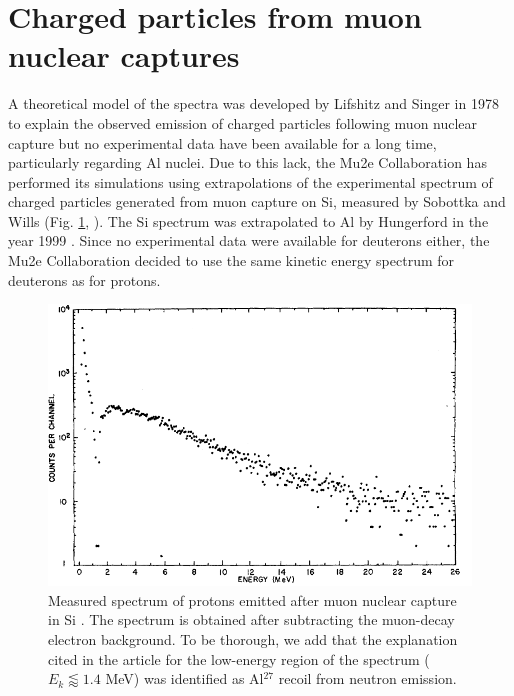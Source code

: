 \documentclass[12pt,a4paper,openright, oneside, titlepage]{book} %
\begin{document}
\section{Charged particles from muon nuclear captures}
A theoretical model of the spectra was developed by Lifshitz and Singer in 1978 \cite{Lifshitz} 
to explain the observed emission of charged particles following muon nuclear capture 
but no experimental data have been available for a long time, particularly regarding Al nuclei.
Due to this lack, the Mu2e Collaboration has performed its simulations using extrapolations of the experimental spectrum of charged particles generated from muon capture on Si, measured by Sobottka and Wills (Fig. \ref{_sobottka}, \cite{Sobottka}).
The Si spectrum was extrapolated to Al by Hungerford in the year 1999 \cite{Hungerford}.
Since no experimental data were available for deuterons either, the Mu2e Collaboration decided to use the same kinetic energy spectrum for deuterons as for protons.

\begin{figure}[!htb]
\centering
\includegraphics[scale=0.8]{sobottka}
\caption[Proton spectrum from nuclear capture in Si]{Measured spectrum of protons emitted after muon nuclear capture in Si \cite{Sobottka}. 
The spectrum is obtained after subtracting the muon-decay electron background.
To be thorough, we add that the explanation cited in the article for the low-energy region of the spectrum ($E_k\lessapprox1.4$ MeV) was identified as Al$^{27}$ recoil from neutron emission. }
\label{_sobottka}
\end{figure}
\end{document}
